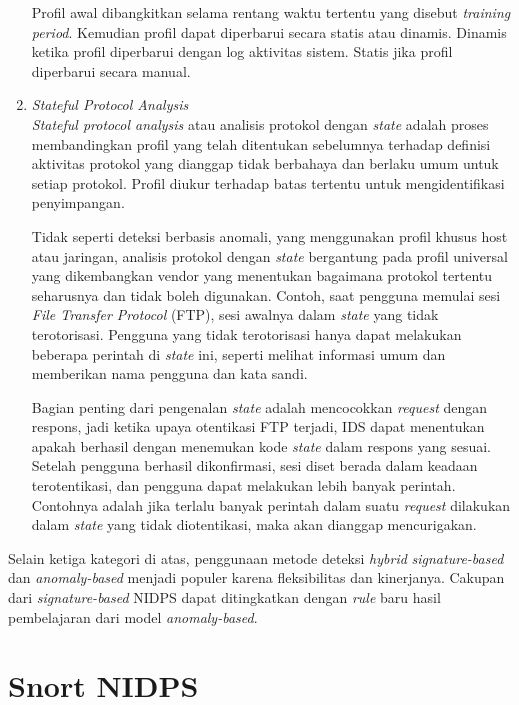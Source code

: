 \begin{enumerate}
      Profil awal dibangkitkan selama rentang waktu tertentu yang disebut \emph{training period}. Kemudian profil dapat diperbarui secara statis atau dinamis. Dinamis ketika profil diperbarui dengan log aktivitas sistem. Statis jika profil diperbarui secara manual.

      \item
      \emph{Stateful Protocol Analysis} \\
      \emph{Stateful protocol analysis} atau analisis protokol dengan \emph{state} adalah proses membandingkan profil yang telah ditentukan sebelumnya terhadap definisi aktivitas protokol yang dianggap tidak berbahaya dan berlaku umum untuk setiap protokol. Profil diukur terhadap batas tertentu untuk mengidentifikasi penyimpangan. 

      Tidak seperti deteksi berbasis anomali, yang menggunakan profil khusus host atau jaringan, analisis protokol dengan \emph{state} bergantung pada profil universal yang dikembangkan vendor yang menentukan bagaimana protokol tertentu seharusnya dan tidak boleh digunakan. Contoh, saat pengguna memulai sesi \emph{File Transfer Protocol} (FTP), sesi awalnya dalam \emph{state} yang tidak terotorisasi. Pengguna yang tidak terotorisasi hanya dapat melakukan beberapa perintah di \emph{state} ini, seperti melihat informasi umum dan memberikan nama pengguna dan kata sandi. 

      Bagian penting dari pengenalan \emph{state} adalah mencocokkan \emph{request} dengan respons, jadi ketika upaya otentikasi FTP terjadi, IDS dapat menentukan apakah berhasil dengan menemukan kode \emph{state} dalam respons yang sesuai. Setelah pengguna berhasil dikonfirmasi, sesi diset berada dalam keadaan terotentikasi, dan pengguna dapat melakukan lebih banyak perintah. Contohnya adalah jika terlalu banyak perintah dalam suatu \emph{request} dilakukan dalam \emph{state} yang tidak diotentikasi, maka akan dianggap mencurigakan. 

    \end{enumerate}

    Selain ketiga kategori di atas, penggunaan metode deteksi \emph{hybrid} \emph{signature-based} dan \emph{anomaly-based} menjadi populer karena fleksibilitas dan kinerjanya. Cakupan dari \emph{signature-based} NIDPS dapat ditingkatkan dengan \emph{rule} baru hasil pembelajaran dari model \emph{anomaly-based}.

\section{Snort NIDPS}

